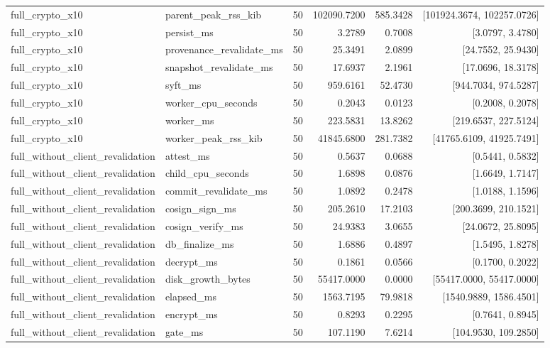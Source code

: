 \begin{tabular}{llrrrr}
full\_crypto\_x10 & parent\_peak\_rss\_kib & 50 & 102090.7200 & 585.3428 & [101924.3674, 102257.0726] \\
full\_crypto\_x10 & persist\_ms & 50 & 3.2789 & 0.7008 & [3.0797, 3.4780] \\
full\_crypto\_x10 & provenance\_revalidate\_ms & 50 & 25.3491 & 2.0899 & [24.7552, 25.9430] \\
full\_crypto\_x10 & snapshot\_revalidate\_ms & 50 & 17.6937 & 2.1961 & [17.0696, 18.3178] \\
full\_crypto\_x10 & syft\_ms & 50 & 959.6161 & 52.4730 & [944.7034, 974.5287] \\
full\_crypto\_x10 & worker\_cpu\_seconds & 50 & 0.2043 & 0.0123 & [0.2008, 0.2078] \\
full\_crypto\_x10 & worker\_ms & 50 & 223.5831 & 13.8262 & [219.6537, 227.5124] \\
full\_crypto\_x10 & worker\_peak\_rss\_kib & 50 & 41845.6800 & 281.7382 & [41765.6109, 41925.7491] \\
full\_without\_client\_revalidation & attest\_ms & 50 & 0.5637 & 0.0688 & [0.5441, 0.5832] \\
full\_without\_client\_revalidation & child\_cpu\_seconds & 50 & 1.6898 & 0.0876 & [1.6649, 1.7147] \\
full\_without\_client\_revalidation & commit\_revalidate\_ms & 50 & 1.0892 & 0.2478 & [1.0188, 1.1596] \\
full\_without\_client\_revalidation & cosign\_sign\_ms & 50 & 205.2610 & 17.2103 & [200.3699, 210.1521] \\
full\_without\_client\_revalidation & cosign\_verify\_ms & 50 & 24.9383 & 3.0655 & [24.0672, 25.8095] \\
full\_without\_client\_revalidation & db\_finalize\_ms & 50 & 1.6886 & 0.4897 & [1.5495, 1.8278] \\
full\_without\_client\_revalidation & decrypt\_ms & 50 & 0.1861 & 0.0566 & [0.1700, 0.2022] \\
full\_without\_client\_revalidation & disk\_growth\_bytes & 50 & 55417.0000 & 0.0000 & [55417.0000, 55417.0000] \\
full\_without\_client\_revalidation & elapsed\_ms & 50 & 1563.7195 & 79.9818 & [1540.9889, 1586.4501] \\
full\_without\_client\_revalidation & encrypt\_ms & 50 & 0.8293 & 0.2295 & [0.7641, 0.8945] \\
full\_without\_client\_revalidation & gate\_ms & 50 & 107.1190 & 7.6214 & [104.9530, 109.2850] \\

\end{tabular}
